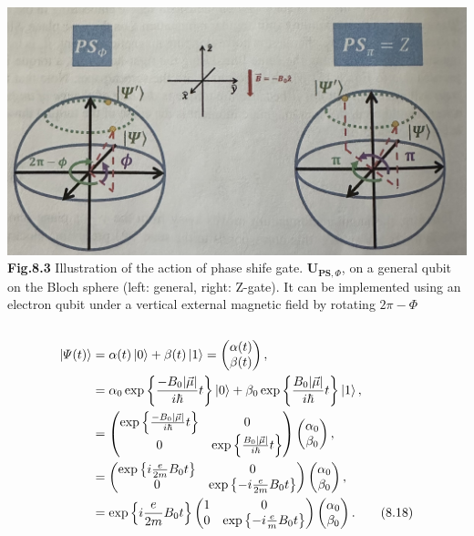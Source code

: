 \documentclass{article}
\begin{document}
\includegraphics[scale=0.5]{Fig.8.3.jpeg}\\
\textbf{Fig.8.3} Illustration of the action of phase shife gate. $\boldsymbol{U_{PS,\varPhi}}$, on a general qubit
on the Bloch sphere (left: general, right: Z-gate). It can be implemented using an electron qubit under a vertical 
external magnetic field by rotating $2\pi-\varPhi$\\\\
\begin{align*}\label{eq 8.18}
    \ket{\varPsi(t)}&= \alpha(t)\ket{0}+\beta(t)\ket{1}=\begin{pmatrix}
        \alpha(t)\\ \beta(t)
    \end{pmatrix},\\
    &=\alpha_0\exp\left\{\frac{-B_0|\vec{\mu}|}{i\hbar}t\right\}\ket{0}+\beta_0\exp\left\{\frac{B_0|\vec{\mu}|}{i\hbar}t\right\}\ket{1},\\
    &=\begin{pmatrix}
        \exp\left\{\frac{-B_0|\vec{\mu}|}{i\hbar}t\right\}&0\\
        0&\exp\left\{\frac{B_0|\vec{\mu}|}{i\hbar}t\right\}
    \end{pmatrix}\begin{pmatrix}
        \alpha_0\\ \beta_0
    \end{pmatrix},\\
    &=\begin{pmatrix}
        \exp\left\{i\frac{e}{2m}B_0t\right\}&0\\
        0&\exp\left\{-i\frac{e}{2m}B_0t\right\}
    \end{pmatrix}\begin{pmatrix}
        \alpha_0\\ \beta_0
    \end{pmatrix},\\
    &=\exp\left\{i\frac{e}{2m}B_0t\right\}\begin{pmatrix}
        1&0\\0&\exp\left\{-i\frac{e}{m}B_0t\right\}
    \end{pmatrix}\begin{pmatrix}
        \alpha_0\\ \beta_0
    \end{pmatrix}.\tag{8.18}
\end{align*}\\
\end{document}
